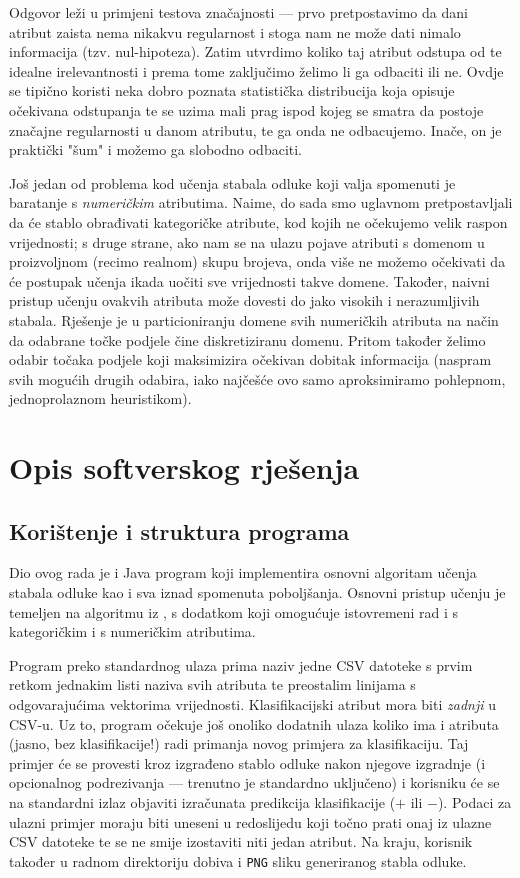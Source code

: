 \documentclass[12pt,a4paper]{article}
\begin{document}
Odgovor leži u primjeni testova značajnosti --- prvo pretpostavimo da dani atribut zaista nema nikakvu regularnost
i stoga nam ne može dati nimalo informacija (tzv. nul-hipoteza). Zatim utvrdimo koliko taj atribut odstupa od
te idealne irelevantnosti i prema tome zaključimo želimo li ga odbaciti ili ne. Ovdje se tipično koristi neka dobro poznata
statistička distribucija koja opisuje očekivana odstupanja te se uzima mali prag ispod kojeg se smatra da postoje značajne
regularnosti u danom atributu, te ga onda ne odbacujemo. Inače, on je praktički "šum" i možemo ga slobodno odbaciti. \cite{rn}

Još jedan od problema kod učenja stabala odluke koji valja spomenuti je baratanje s \emph{numeričkim} atributima.
Naime, do sada smo uglavnom pretpostavljali da će stablo obrađivati kategoričke atribute, kod kojih ne očekujemo
velik raspon vrijednosti; s druge strane, ako nam se na ulazu pojave atributi s domenom u proizvoljnom (recimo realnom) skupu brojeva,
onda više ne možemo očekivati da će postupak učenja ikada uočiti sve vrijednosti takve domene. Također, naivni pristup
učenju ovakvih atributa može dovesti do jako visokih i nerazumljivih stabala. Rješenje je u particioniranju domene svih
numeričkih atributa na način da odabrane točke podjele čine diskretiziranu domenu. Pritom također želimo odabir točaka
podjele koji maksimizira očekivan dobitak informacija (naspram svih mogućih drugih odabira, iako najčešće ovo samo aproksimiramo
pohlepnom, jednoprolaznom heuristikom).

\section{Opis softverskog rješenja}
\subsection{Korištenje i struktura programa}
Dio ovog rada je i Java program koji implementira osnovni algoritam učenja stabala odluke kao i sva iznad spomenuta poboljšanja.
Osnovni pristup učenju je temeljen na algoritmu iz \cite{rn}, s dodatkom koji omogućuje istovremeni rad i s kategoričkim i s
numeričkim atributima.

Program preko standardnog ulaza prima naziv jedne CSV datoteke s prvim retkom jednakim listi naziva svih atributa
te preostalim linijama s odgovarajućima vektorima vrijednosti. Klasifikacijski atribut mora biti \emph{zadnji} u CSV-u.
Uz to, program očekuje još onoliko dodatnih ulaza koliko ima i atributa 
(jasno, bez klasifikacije!) radi primanja novog primjera za klasifikaciju. Taj primjer će se provesti kroz izgrađeno stablo odluke nakon
njegove izgradnje (i opcionalnog podrezivanja --- trenutno je standardno uključeno) i korisniku će se na standardni izlaz objaviti
izračunata predikcija klasifikacije ($+$ ili $-$). Podaci za ulazni primjer moraju biti uneseni u redoslijedu koji točno prati onaj iz
ulazne CSV datoteke te se ne smije izostaviti niti jedan atribut. Na kraju, korisnik također u radnom direktoriju dobiva i 
\texttt{PNG} sliku generiranog stabla odluke.
\end{document}
